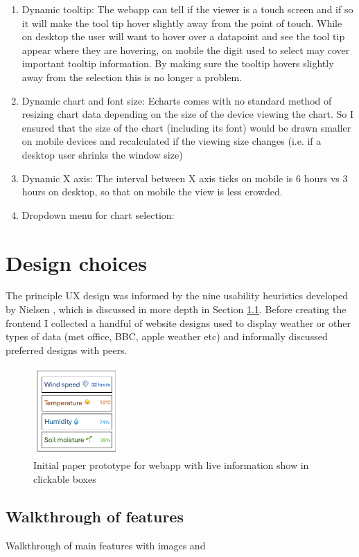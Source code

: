\begin{enumerate}
    \item Dynamic tooltip: The webapp can tell if the viewer is a touch screen
          and if so it will make the tool tip hover slightly away from the point
          of touch. While on desktop the user will want to hover over a
          datapoint and see the tool tip appear where they are hovering, on
          mobile the digit used to select may cover important tooltip
          information. By making sure the tooltip hovers slightly away from the
          selection this is no longer a problem.
    \item Dynamic chart and font size: Echarts comes with no standard method of
          resizing chart data depending on the size of the device viewing the
          chart. So I ensured that the size of the chart (including its font)
          would be drawn smaller on mobile devices and recalculated if the
          viewing size changes (i.e. if a desktop user shrinks the window size)
    \item Dynamic X axis: The interval between X axis ticks on mobile is 6 hours
        vs 3 hours on desktop, so that on mobile the view is less crowded.
    \item Dropdown menu for chart selection:
\end{enumerate}

\section{Design choices}

The principle UX design was informed by the nine usability heuristics developed
by Nielsen \cite{nielsen1990heuristic}, which is discussed in more depth in
Section \ref{sec:walkthrough}. Before creating the frontend I collected a
handful of website designs used to display weather or other types of data (met
office, BBC, apple weather etc) and informally discussed preferred designs with
peers.

\begin{figure}[H]
    \centering
    \includegraphics[width=0.3\textwidth]{contents/part-3/fig3/paper-prototype.png}
    \caption{Initial paper prototype for webapp with live information show in clickable boxes}
    \label{fig:paper-prototype}
\end{figure}

\subsection{ Walkthrough of features}\label{sec:walkthrough}

Walkthrough of main features with images and 



